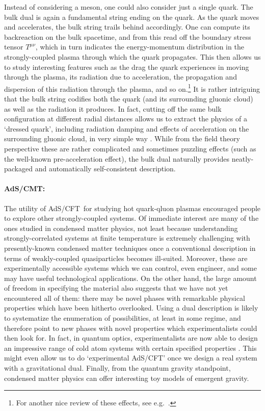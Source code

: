 \documentclass[12pt]{article}
\def\AC{AdS/CFT}
\begin{document}
Instead of considering a meson, one could also consider just a single quark.  The bulk dual is again a fundamental string ending on the quark.  As the quark moves and accelerates, the bulk string trails behind accordingly.  One can compute its backreaction on the bulk spacetime, and from this read off the boundary stress tensor $T^{\mu\nu}$, which in turn indicates the energy-momentum distribution in the strongly-coupled plasma through which the quark propagates.  This then allows us to study interesting features such as the drag the quark experiences in moving through the plasma, its radiation due to acceleration,  the propagation and dispersion of this radiation through the plasma, and so on.\footnote{
For another nice review of these effects, see e.g.\ \cite{Chernicoff:2008sa}.
}  It is rather intriguing that the bulk string codifies both the quark (and its surrounding gluonic cloud) as well as the radiation it produces.  In fact,  cutting off the same bulk configuration at different radial distances allows us to extract the physics of a `dressed quark', including radiation damping and effects of acceleration on the surrounding gluonic cloud, in very simple way \cite{Chernicoff:2010wg}.  While from the field theory perspective these are rather complicated and sometimes puzzling effects (such as the well-known pre-acceleration effect), the bulk dual naturally provides neatly-packaged and automatically self-consistent description.

\paragraph{AdS/CMT:}  %
The utility of \AC\ for studying hot quark-qluon plasmas encouraged people to explore other strongly-coupled systems.  Of immediate interest are many of the ones studied in condensed matter physics, not least because understanding  strongly-correlated systems at finite temperature is extremely challenging with presently-known condensed matter techniques once a conventional description in terms of weakly-coupled quasiparticles becomes ill-suited.  Moreover, these are experimentally accessible systems which we can control, even engineer, and some may have useful technological applications.  On the other hand, the large amount of freedom in specifying the material also suggests that we have not yet encountered all of them:  there may be novel phases with remarkable physical properties which have been hitherto overlooked.  Using a dual description is likely to systematize the enumeration of possibilities, at least in some regime, and therefore point to  new phases with novel properties which experimentalists could then look for.  In fact, in quantum optics, experimentalists are now able to design an impressive range of cold atom systems with certain specified properties \cite{greiner2008cm}.  This might even allow us to do `experimental \AC' once we design a real system with a gravitational dual.
Finally, from the quantum gravity standpoint, condensed matter physics can offer interesting toy models of emergent gravity.
\end{document}
